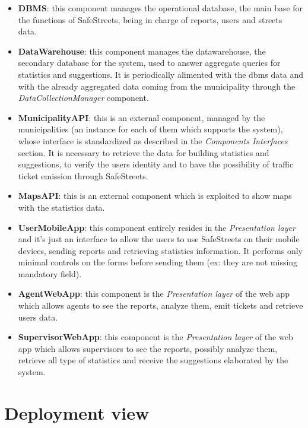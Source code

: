 \documentclass[a4paper]{report}
\begin{document}
\begin{itemize}
\item \textbf{DBMS}: this component manages the operational database, the main base for the functions of SafeStreets, being in charge of reports, users and streets data.

\item \textbf{DataWarehouse}: this component manages the datawarehouse, the secondary database for the system, used to answer aggregate queries for statistics and suggestions. It is periodically alimented with the dbms data and with the already aggregated data coming from the municipality through the \textit{DataCollectionManager} component.

\item \textbf{MunicipalityAPI}: this is an external component, managed by the municipalities (an instance for each of them which supports the system), whose interface is standardized as described in the \textit{Components Interfaces} section. It is necessary to retrieve the data for building statistics and suggestions, to verify the users identity and to have the possibility of traffic ticket emission through SafeStreets.

\item \textbf{MapsAPI}: this is an external component which is exploited to show maps with the statistics data.

\item \textbf{UserMobileApp}: this component entirely resides in the \textit{Presentation layer} and it's just an interface to allow the users to use SafeStreets on their mobile devices, sending reports and retrieving statistics information. It performs only minimal controls on the forms before sending them (ex: they are not missing mandatory field).

\item \textbf{AgentWebApp}: this component is the \textit{Presentation layer} of the web app which allows agents to see the reports, analyze them, emit tickets and retrieve users data.

\item \textbf{SupervisorWebApp}: this component is the \textit{Presentation layer} of the web app which allows supervisors to see the reports, possibly analyze them, retrieve all type of statistics and receive the suggestions elaborated by the system. 



\end{itemize}

\section{Deployment view}
\end{document}

